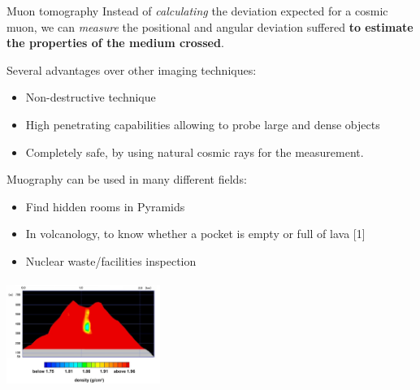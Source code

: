 \documentclass[8 pt]{beamer}
\begin{document}
\begin{frame}{Muon tomography}
Instead of \textit{calculating} the deviation expected for a cosmic muon, we can \textit{measure} the positional and angular deviation suffered \textbf{to estimate the properties of the medium crossed}. \vfill

Several advantages over other imaging techniques:
\begin{itemize}
\justifying
\item Non-destructive technique
\item High penetrating capabilities allowing to probe large and dense objects
\item Completely safe, by using natural cosmic rays for the measurement.
\end{itemize} \vspace{10pt}

\begin{minipage}[c]{.54\textwidth}
\justifying

	Muography can be used in many different fields:
\begin{itemize}
	\justifying
	\item Find hidden rooms in Pyramids
	\item In volcanology, to know whether a pocket is empty or full of lava [1]
	\item Nuclear waste/facilities inspection
\end{itemize}	
	
\end{minipage} \hfill
\begin{minipage}[c]{.44\textwidth}
	\begin{center}
	\includegraphics[width=5cm, height=3.5cm]{figs/volcano.jpg}
	\end{center}
\end{minipage} \hfill \vfill
\end{frame}
\end{document}
